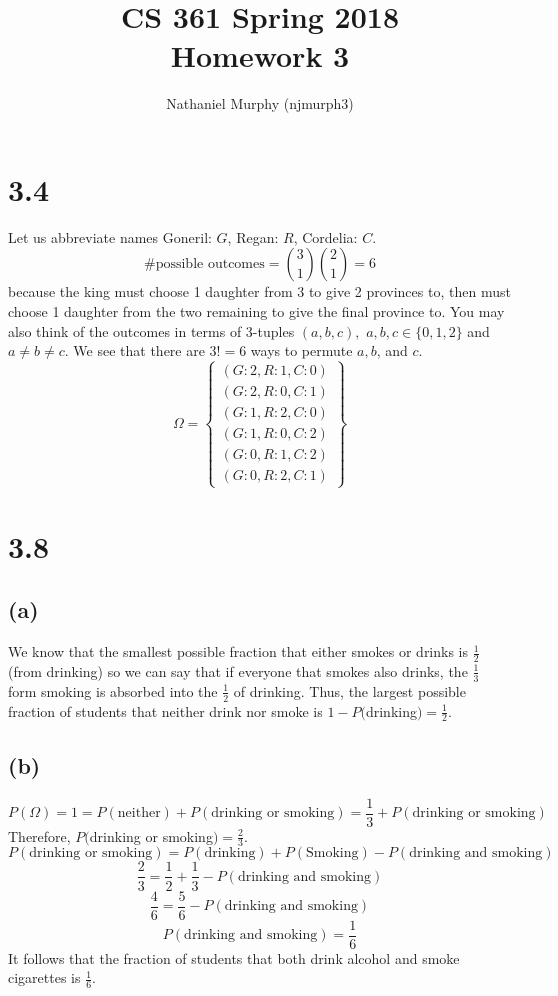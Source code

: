 \documentclass[11pt]{article}
\title{\textbf{CS 361 Spring 2018 \\ Homework 3}}
\author{Nathaniel Murphy (njmurph3)}
\begin{document}
\maketitle
\section*{3.4}
Let us abbreviate names Goneril: $G$, Regan: $R$, Cordelia: $C$.
\[\text{\# possible outcomes}=\binom{3}{1}\binom{2}{1}=6\]
because the king must choose 1 daughter from 3 to give 2 provinces to, then must choose 1 daughter from the two remaining to give the final province to. You may also think of the outcomes in terms of 3-tuples $(a,b,c),$ $a,b,c\in\{0,1,2\}$ and $a\neq b\neq c$. We see that there are $3!=6$ ways to permute $a,b$, and $c$.
\[
	\Omega=\left\{\begin{array}{l}
		(G:2,R:1,C:0) \\
		(G:2,R:0,C:1) \\
		(G:1,R:2,C:0) \\
		(G:1,R:0,C:2) \\
		(G:0,R:1,C:2) \\
		(G:0,R:2,C:1)
	\end{array}
	\right\}
\]
\section*{3.8}
\subsection*{(a)}
We know that the smallest possible fraction that either smokes or drinks is $\frac{1}{2}$ (from drinking) so we can say that if everyone that smokes also drinks, the $\frac{1}{3}$ form smoking is absorbed into the $\frac{1}{2}$ of drinking. Thus, the largest possible fraction of students that neither drink nor smoke is $1-P($drinking$)=\frac{1}{2}$.
\clearpage
\subsection*{(b)}
\[P(\Omega)=1=P(\text{neither})+P(\text{drinking or smoking})=\frac{1}{3}+P(\text{drinking or smoking})\]
Therefore, $P($drinking or smoking$)=\frac{2}{3}$.
\[P(\text{drinking or smoking})=P(\text{drinking})+P(\text{Smoking})-P(\text{drinking and smoking})\]
\[\frac{2}{3}=\frac{1}{2}+\frac{1}{3}-P(\text{drinking and smoking})\]
\[\frac{4}{6}=\frac{5}{6}-P(\text{drinking and smoking})\]
\[P(\text{drinking and smoking})=\frac{1}{6}\]
It follows that the fraction of students that both drink alcohol and smoke cigarettes is $\frac{1}{6}$.
\end{document}
